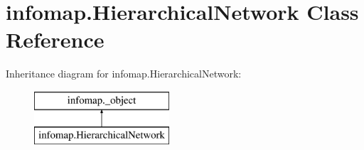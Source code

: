 \hypertarget{classinfomap_1_1HierarchicalNetwork}{}\section{infomap.\+Hierarchical\+Network Class Reference}
\label{classinfomap_1_1HierarchicalNetwork}
Inheritance diagram for infomap.\+Hierarchical\+Network\+:\begin{figure}[H]
\begin{center}
\leavevmode
\includegraphics[height=2.000000cm]{classinfomap_1_1HierarchicalNetwork}
\end{center}
\end{figure}
